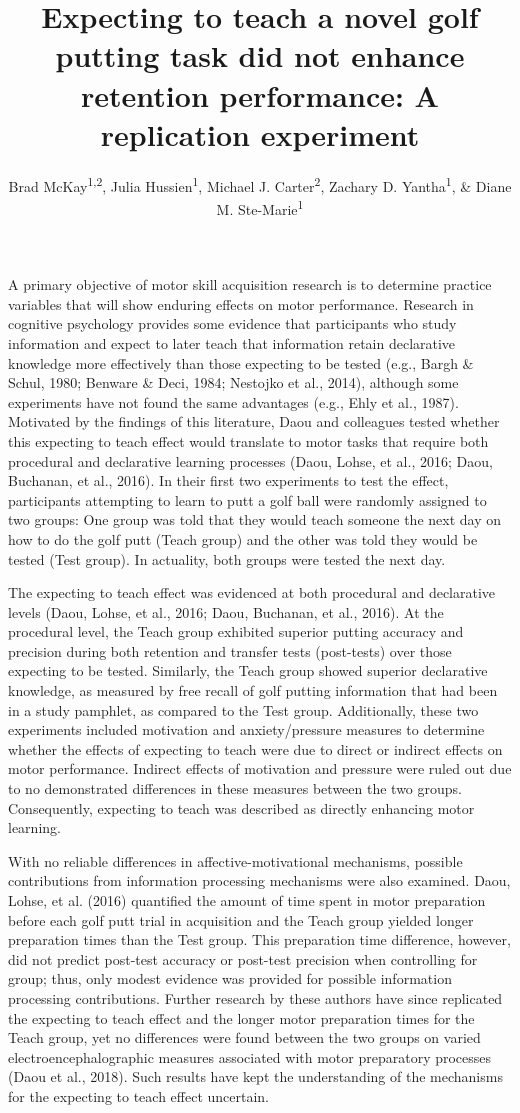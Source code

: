 \documentclass[
  english,
  man,floatsintext]{apa7}
\title{Expecting to teach a novel golf putting task did not enhance retention performance: A replication experiment}
\author{Brad McKay\textsuperscript{1,2}, Julia Hussien\textsuperscript{1}, Michael J. Carter\textsuperscript{2}, Zachary D. Yantha\textsuperscript{1}, \& Diane M. Ste-Marie\textsuperscript{1}}
\date{}
\affiliation{\vspace{0.5cm}\textsuperscript{1} School of Human Kinetics, University of Ottawa\\\textsuperscript{2} Department of Kinesiology, McMaster University}
\begin{document}
\maketitle

A primary objective of motor skill acquisition research is to determine practice variables that will show enduring effects on motor performance. Research in cognitive psychology provides some evidence that participants who study information and expect to later teach that information retain declarative knowledge more effectively than those expecting to be tested (e.g., Bargh \& Schul, 1980; Benware \& Deci, 1984; Nestojko et al., 2014), although some experiments have not found the same advantages (e.g., Ehly et al., 1987). Motivated by the findings of this literature, Daou and colleagues tested whether this expecting to teach effect would translate to motor tasks that require both procedural and declarative learning processes (Daou, Lohse, et al., 2016; Daou, Buchanan, et al., 2016). In their first two experiments to test the effect, participants attempting to learn to putt a golf ball were randomly assigned to two groups: One group was told that they would teach someone the next day on how to do the golf putt (Teach group) and the other was told they would be tested (Test group). In actuality, both groups were tested the next day.

The expecting to teach effect was evidenced at both procedural and declarative levels (Daou, Lohse, et al., 2016; Daou, Buchanan, et al., 2016). At the procedural level, the Teach group exhibited superior putting accuracy and precision during both retention and transfer tests (post-tests) over those expecting to be tested. Similarly, the Teach group showed superior declarative knowledge, as measured by free recall of golf putting information that had been in a study pamphlet, as compared to the Test group. Additionally, these two experiments included motivation and anxiety/pressure measures to determine whether the effects of expecting to teach were due to direct or indirect effects on motor performance. Indirect effects of motivation and pressure were ruled out due to no demonstrated differences in these measures between the two groups. Consequently, expecting to teach was described as directly enhancing motor learning.

With no reliable differences in affective-motivational mechanisms, possible contributions from information processing mechanisms were also examined. Daou, Lohse, et al. (2016) quantified the amount of time spent in motor preparation before each golf putt trial in acquisition and the Teach group yielded longer preparation times than the Test group. This preparation time difference, however, did not predict post-test accuracy or post-test precision when controlling for group; thus, only modest evidence was provided for possible information processing contributions. Further research by these authors have since replicated the expecting to teach effect and the longer motor preparation times for the Teach group, yet no differences were found between the two groups on varied electroencephalographic measures associated with motor preparatory processes (Daou et al., 2018). Such results have kept the understanding of the mechanisms for the expecting to teach effect uncertain.
\end{document}

